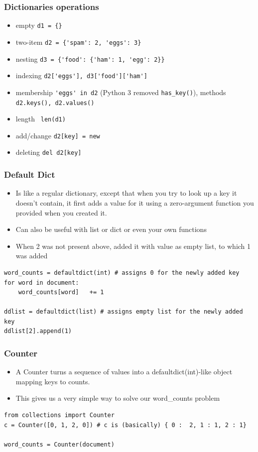 \begin{frame}[fragile]\frametitle{Dictionaries operations}
  \begin{itemize}
  \item empty  \lstinline|d1 = {}|
  \item two-item \lstinline|d2 = {'spam': 2, 'eggs': 3}|
  \item nesting \lstinline|d3 = {'food': {'ham': 1, 'egg': 2}}|
  \item indexing \lstinline|d2['eggs'], d3['food']['ham']|
  \item membership \lstinline|'eggs' in d2| (Python 3 removed \lstinline|has_key()|), methods \lstinline|d2.keys(), d2.values()|
  \item length \lstinline| len(d1)|
  \item add/change \lstinline|d2[key] = new|
  \item deleting \lstinline|del d2[key]|
  \end{itemize}
\end{frame}

\begin{frame}[fragile]\frametitle{Default Dict}
  \begin{itemize}
  \item Is like a regular dictionary, except that when you try	to look up a key it doesn't	contain, it first adds a value for it using a zero-argument function you provided when you created it.
  \item Can also be useful with list	or dict	or even your	own functions
  \item When 2 was not present above, added it with value as empty list, to which 1 was added
  \end{itemize}
  \begin{lstlisting}
word_counts = defaultdict(int) # assigns 0 for the newly added key
for word in document:
	word_counts[word]	+= 1

ddlist = defaultdict(list) # assigns empty list for the newly added key
ddlist[2].append(1)
  \end{lstlisting}
\end{frame}

\begin{frame}[fragile]\frametitle{Counter}
  \begin{itemize}
  \item A Counter turns a sequence of values into a defaultdict(int)-like object mapping keys to counts.
  \item This gives us a very simple way to	solve our word\_counts problem
  \end{itemize}
  \begin{lstlisting}
from collections import Counter
c = Counter([0, 1, 2, 0]) # c is (basically) { 0 :	2, 1 : 1, 2 : 1}

word_counts = Counter(document)
  \end{lstlisting}
\end{frame}


